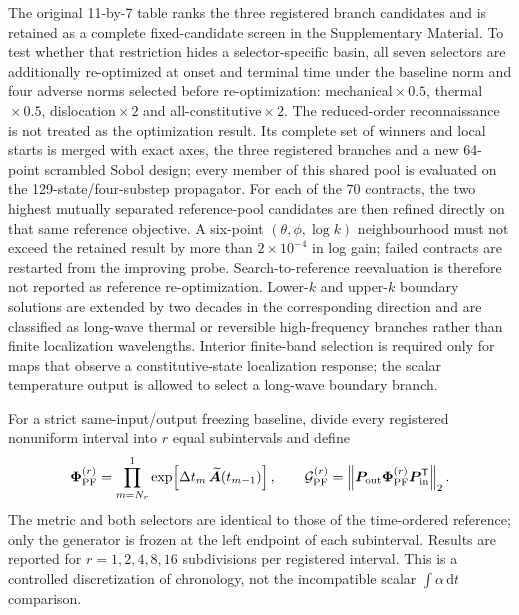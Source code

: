 The original 11-by-7 table ranks the three registered branch candidates and is
retained as a complete fixed-candidate screen in the Supplementary Material.
To test whether that restriction hides a selector-specific basin, all seven
selectors are additionally re-optimized at onset and terminal time under the
baseline norm and four adverse norms selected before re-optimization:
mechanical${}\times0.5$, thermal${}\times0.5$,
dislocation${}\times2$ and all-constitutive${}\times2$.  The reduced-order
reconnaissance is not treated as the optimization result.  Its complete set of
winners and local starts is merged with exact axes, the three registered
branches and a new 64-point scrambled Sobol design; every member of this shared
pool is evaluated on the 129-state/four-substep propagator.  For each of the 70
contracts, the two highest mutually separated reference-pool candidates are
then refined directly on that same reference objective.  A six-point
$(\theta,\phi,\log k)$ neighbourhood must not exceed the retained result by
more than $2\times10^{-4}$ in log gain; failed contracts are restarted from
the improving probe.  Search-to-reference reevaluation is therefore not
reported as reference re-optimization.  Lower-$k$ and upper-$k$ boundary
solutions are extended by two decades in the corresponding direction and are
classified as long-wave thermal or reversible high-frequency branches rather
than finite localization wavelengths.  Interior finite-band selection is
required only for maps that observe a constitutive-state localization
response; the scalar temperature output is allowed to select a long-wave
boundary branch.

For a strict same-input/output freezing baseline, divide every registered
nonuniform interval into $r$ equal subintervals and define
\begin{equation}
 \boldsymbol\Phi_{\rm PF}^{(r)}
 =\prod_{m=N_r}^{1}
 \exp\!\left[\Delta t_m\,
 \widetilde{\boldsymbol A}(t_{m-1})\right],
 \qquad
 \mathcal G_{\rm PF}^{(r)}
 =\left\|\boldsymbol P_{\rm out}
 \boldsymbol\Phi_{\rm PF}^{(r)}
 \boldsymbol P_{\rm in}^{\mathsf T}\right\|_2 .
 \label{eq:ft_piecewise_frozen_same_selector}
\end{equation}
The metric and both selectors are identical to those of the time-ordered
reference; only the generator is frozen at the left endpoint of each
subinterval.  Results are reported for $r=1,2,4,8,16$ subdivisions per
registered interval.  This is a
controlled discretization of chronology, not the incompatible scalar
$\int\alpha\,\mathrm dt$ comparison.

